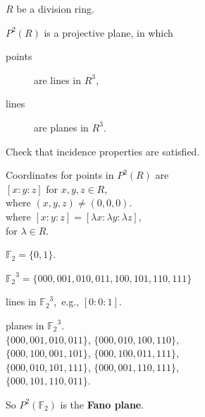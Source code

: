 \documentclass[14pt]{chalkfjord}
\begin{document}
\begin{frame}

  $R$ be a division ring.

  \vfill\pause

  $P^2(R)$ is a projective plane, in which
  \begin{description}
  \item[points] are lines in $R^3$,
  \item[lines] are planes in $R^3$.
  \end{description}

  \vfill\pause

  Check that incidence properties are satisfied.

\end{frame}

\begin{frame}

  \vfill

  Coordinates for points in $P^2(R)$ are \\
  \quad $[x:y:z]$ for $x, y, z \in R$, \\
  \quad where $(x,y,z) \neq (0,0,0)$. \\
  \vspace{3ex}
  where $[x:y:z] = [\lambda x:\lambda y:\lambda z]$, \\
  \quad for $\lambda \in R$.

  \vfill

\end{frame}

\begin{frame}
  $\mathbb{F}_2 = \{ 0, 1 \}$.

  \vfill\pause

  ${\mathbb{F}_2}^3 = \{ 000, 001, 010, 011, 100, 101, 110, 111 \}$

  \vfill{} lines in ${\mathbb{F}_2}^3$,\pause\ e.g., $[0:0:1]$.

  \vfill{} planes in ${\mathbb{F}_2}^3$. \\
  \quad $\{ 000, 001, 010, 011 \}$, $\{ 000, 010, 100, 110 \}$, \\
  \quad $\{ 000, 100, 001, 101 \}$, $\{ 000, 100, 011, 111 \}$, \\
  \quad $\{ 000, 010, 101, 111 \}$, $\{ 000, 001, 110, 111 \}$, \\
  \quad $\{ 000, 101, 110, 011 \}$.

  \vfill\pause

  So $P^2(\mathbb{F}_2)$ is the \textbf{Fano plane}.

\end{frame}
\end{document}
